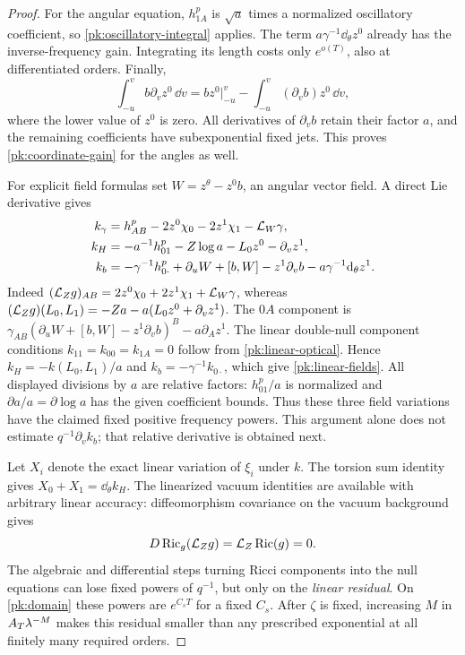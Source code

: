 \begin{proof}
For the angular equation, $h^p_{1A}$ is $\sqrt a$ times a
normalized oscillatory coefficient, so \eqref{pk:oscillatory-integral}
applies. The term $a\gamma^{-1}\dd_\theta z^0$ already has the
inverse-frequency gain. Integrating its length costs only
$e^{o(T)}$, also at differentiated orders. Finally,
\[
 \int_{-u}^{v}b\partial_vz^0\,\dd v
   =bz^0\big|_{-u}^{v}-\int_{-u}^{v}(\partial_vb)z^0\,\dd v,
\]
where the lower value of $z^0$ is zero. All derivatives of
$\partial_vb$ retain their factor $a$, and the remaining
coefficients have subexponential fixed jets. This proves
\eqref{pk:coordinate-gain} for the angles as well.

For explicit field formulas set $W=z^\theta-z^0b$, an angular
vector field. A direct Lie derivative gives
\begin{equation}\label{pk:linear-fields}
 \begin{aligned}
 k_\gamma&=h^p_{AB}-2z^0\chi_0-2z^1\chi_1-\mathcal L_W\gamma,\\
 k_H&=-a^{-1}h^p_{01}-Z\log a-L_0z^0-\partial_vz^1,\\
 k_b&=-\gamma^{-1}h^p_{0\cdot}
       +\partial_uW+[b,W]-z^1\partial_vb
                                      -a\gamma^{-1}\mathrm d_\theta z^1.
 \end{aligned}
\end{equation}
Indeed $(\mathcal L_Zg)_{AB}=2z^0\chi_0+2z^1\chi_1+\mathcal L_W\gamma$,
whereas
$(\mathcal L_Zg)(L_0,L_1)=-Za-a(L_0z^0+\partial_vz^1)$.
The $0A$ component is
$\gamma_{AB}(\partial_uW+[b,W]-z^1\partial_vb)^B
-a\partial_Az^1$. The linear double-null component conditions
$k_{11}=k_{00}=k_{1A}=0$ follow from
\eqref{pk:linear-optical}. Hence
$k_H=-k(L_0,L_1)/a$ and $k_b=-\gamma^{-1}k_{0\cdot}$, which
give \eqref{pk:linear-fields}. All displayed divisions by $a$
are relative factors: $h^p_{01}/a$ is normalized and
$\partial a/a=\partial\log a$ has the given coefficient bounds.
Thus these three field variations have the claimed fixed
positive frequency powers. This argument alone does not estimate
$q^{-1}\partial_vk_b$; that relative derivative is obtained next.

Let $X_i$ denote the exact linear variation of $\xi_i$ under $k$.
The torsion sum identity gives $X_0+X_1=\dd_\theta k_H$.
The linearized vacuum identities are available with arbitrary
linear accuracy: diffeomorphism covariance on the vacuum
background gives
\[
 D\operatorname{Ric}_g(\mathcal L_Zg)=\mathcal L_Z\operatorname{Ric}(g)=0.
\]
The algebraic and differential steps turning Ricci components into
the null equations can lose fixed powers of $q^{-1}$, but only
on the \emph{linear residual}. On \eqref{pk:domain} these powers
are $e^{C_sT}$ for a fixed $C_s$. After $\zeta$ is fixed, increasing
$M$ in $A_T\lambda^{-M}$ makes this residual smaller than any
prescribed exponential at all finitely many required orders.


\end{proof}
